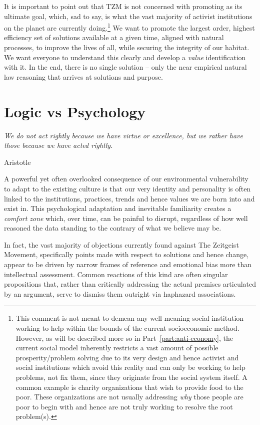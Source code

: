 \documentclass[10pt, a4paper, cleardoubleempty, openright, twoside]{book}
\begin{document}
It is important to point out that TZM is not concerned with promoting
 as its ultimate goal, which, sad to say, is what the
vast majority of activist institutions on the planet are currently
doing.\footnote{
	This comment is not meant to demean any well-meaning social
	institution working to help within the bounds of the current
	socioeconomic method. However, as will be described more so in
	Part~\ref{part:anti-economy}, the current social model inherently
	restricts a vast amount of possible prosperity/problem solving due to
	its very design and hence activist and social institutions which avoid
	this reality and can only be working to help 
	problems, not fix them, since they originate from the social system
	itself. A common example is charity organizations that wish to provide
	food to the poor. These organizations are not usually addressing
	\emph{why} those people are poor to begin with and hence are not truly
	working to resolve the root problem(s).
}
We want to promote the largest order, highest efficiency set of
solutions available at a given time, aligned with natural processes, to
improve the lives of all, while securing the integrity of our habitat.
We want everyone to understand this  clearly
and develop a \emph{value} identification with it. In the end, there is
no single solution -- only the near empirical natural law reasoning that
arrives at solutions and purpose.


\chapter {Logic vs Psychology}
\epigraph{\itshape
	We do not act rightly because we have virtue or excellence, but we
	rather have those because we have acted rightly.
}{Aristotle~\cite{Durant::61}}


A powerful yet often overlooked consequence of our environmental
vulnerability to adapt to the existing culture is that our very identity
and personality is often linked to the institutions, practices, trends
and hence values we are born into and exist in. This psychological
adaptation and inevitable familiarity creates a \emph{comfort zone}
which, over time, can be painful to disrupt, regardless of how well
reasoned the data standing to the contrary of what we believe may be. 


In fact, the vast majority of objections currently found against The
Zeitgeist Movement, specifically points made with respect to solutions
and hence change, appear to be driven by narrow frames of reference and
emotional bias more than intellectual assessment. Common reactions of
this kind are often singular propositions that, rather than critically
addressing the actual premises articulated by an argument, serve to
dismiss them outright via haphazard associations.
\end{document}

